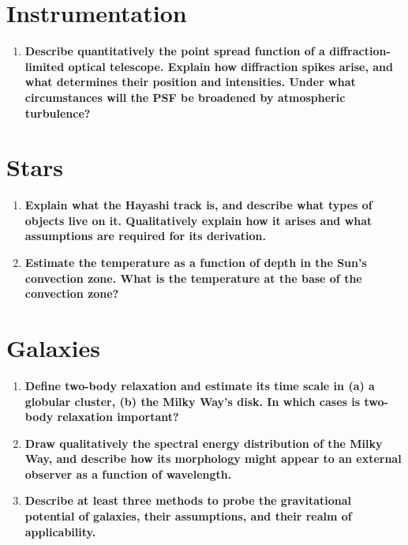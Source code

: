 \documentclass[12pt, letterpaper, preprint]{aastex}
\begin{document}
\section*{Instrumentation}

\begin{enumerate}
  \item \textbf{Describe quantitatively the point spread function 
      of a diffraction-limited optical telescope. 
      Explain how diffraction spikes arise, 
      and what determines their position and intensities. 
      Under what circumstances will the PSF be broadened by atmospheric
      turbulence?}
\end{enumerate}

\section*{Stars}
\begin{enumerate}
  \item \textbf{Explain what the Hayashi track is, 
      and describe what types of objects live on it.
      Qualitatively explain how it arises and what 
      assumptions are required for its derivation.}
  \item \textbf{Estimate the temperature as a function 
      of depth in the Sun’s convection zone.
      What is the temperature at the base of the convection zone?}
\end{enumerate}

\section*{Galaxies}

\begin{enumerate}

\item \textbf{Define two-body relaxation and estimate its time scale in (a) a globular cluster, (b) the Milky Way's disk. In which cases is two-body relaxation important?}

\item \textbf{Draw qualitatively the spectral energy distribution of the Milky Way, and describe how its morphology might appear to an external observer as a function of wavelength.}

\item \textbf{Describe at least three methods to probe the gravitational potential of galaxies, their assumptions, and their realm of applicability.}

\end{enumerate}
\end{document}
